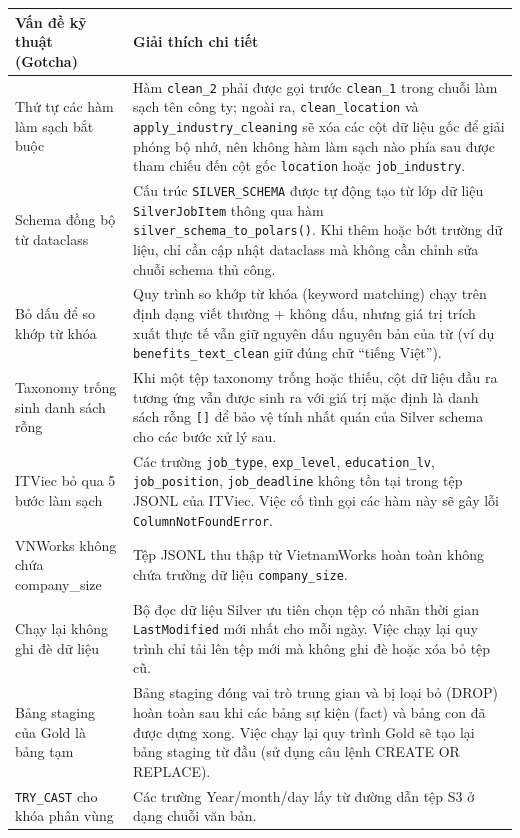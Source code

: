 \begin{longtable}{p{} p{}}
\toprule
\textbf{Vấn đề kỹ thuật (Gotcha)} & \textbf{Giải thích chi tiết} \\
\midrule
\endhead
Thứ tự các hàm làm sạch bắt buộc & Hàm \texttt{clean\_2} phải được gọi trước \texttt{clean\_1}
trong chuỗi làm sạch tên công ty; ngoài ra, \texttt{clean\_location} và \texttt{apply\_industry\_cleaning}
sẽ xóa các cột dữ liệu gốc để giải phóng bộ nhớ, nên không hàm làm sạch nào phía sau được tham chiếu đến cột gốc \texttt{location} hoặc
\texttt{job\_industry}. \\
Schema đồng bộ từ dataclass & Cấu trúc \texttt{SILVER\_SCHEMA} được tự động tạo từ lớp dữ liệu
\texttt{SilverJobItem} thông qua hàm \texttt{silver\_schema\_to\_polars()}.
Khi thêm hoặc bớt trường dữ liệu, chỉ cần cập nhật dataclass mà không cần chỉnh sửa chuỗi schema thủ công. \\
Bỏ dấu để so khớp từ khóa & Quy trình so khớp từ khóa (keyword matching) chạy trên định dạng viết thường + không dấu,
nhưng giá trị trích xuất thực tế vẫn giữ nguyên dấu nguyên bản của từ (ví dụ \texttt{benefits\_text\_clean}
giữ đúng chữ ``tiếng Việt''). \\
Taxonomy trống sinh danh sách rỗng & Khi một tệp taxonomy trống hoặc thiếu, cột dữ liệu đầu ra tương ứng
vẫn được sinh ra với giá trị mặc định là danh sách rỗng \texttt{[]} để bảo vệ tính nhất quán của Silver schema cho các bước xử lý sau. \\
ITViec bỏ qua 5 bước làm sạch & Các trường \texttt{job\_type}, \texttt{exp\_level},
\texttt{education\_lv}, \texttt{job\_position}, \texttt{job\_deadline}
không tồn tại trong tệp JSONL của ITViec. Việc cố tình gọi các hàm này sẽ gây lỗi \texttt{ColumnNotFoundError}. \\
VNWorks không chứa company\_size & Tệp JSONL thu thập từ VietnamWorks hoàn toàn không chứa trường dữ liệu
\texttt{company\_size}. \\
Chạy lại không ghi đè dữ liệu & Bộ đọc dữ liệu Silver ưu tiên chọn tệp có nhãn thời gian \texttt{LastModified}
mới nhất cho mỗi ngày. Việc chạy lại quy trình chỉ tải lên tệp mới mà không ghi đè hoặc xóa bỏ tệp cũ. \\
Bảng staging của Gold là bảng tạm & Bảng staging đóng vai trò trung gian và bị loại bỏ (DROP) hoàn toàn sau khi các bảng sự kiện (fact) và bảng con đã được dựng xong. Việc chạy lại quy trình Gold sẽ tạo lại bảng staging từ đầu (sử dụng câu lệnh CREATE OR REPLACE). \\
\texttt{TRY\_CAST} cho khóa phân vùng & Các trường Year/month/day lấy từ đường dẫn tệp S3 ở dạng chuỗi văn bản.

\end{longtable}
